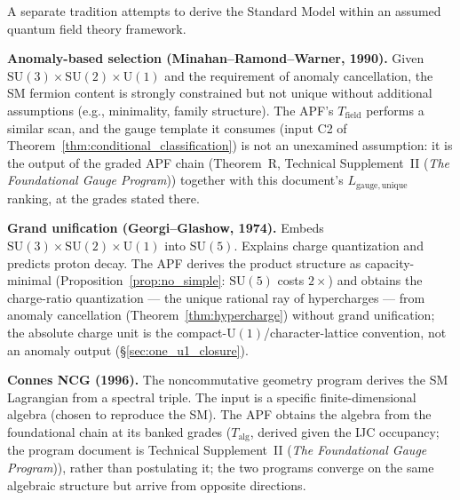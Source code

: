 \documentclass[11pt]{article}
\theoremstyle{definition}
\newcommand{\SU}{\mathrm{SU}}
\newcommand{\U}{\mathrm{U}}
\newcommand{\TSII}{Technical Supplement~II (\emph{The Foundational Gauge Program})}
\begin{document}
A separate tradition attempts to derive the Standard Model within an
assumed quantum field theory framework.

\smallskip\noindent\textbf{Anomaly-based selection
(Minahan--Ramond--Warner, 1990).}\quad
Given $\SU(3) \times \SU(2) \times \U(1)$ and the requirement of
anomaly cancellation, the SM fermion content is strongly constrained
but not unique without additional assumptions (e.g., minimality,
family structure).  The APF's $T_{\mathrm{field}}$ performs a similar
scan, and the gauge template it consumes (input C2 of
Theorem~\ref{thm:conditional_classification}) is not an unexamined
assumption: it is the output of the graded APF chain (Theorem~R,
\TSII{}) together with this document's $L_{\mathrm{gauge,unique}}$
ranking, at the grades stated there.

\smallskip\noindent\textbf{Grand unification (Georgi--Glashow, 1974).}\quad
Embeds $\SU(3) \times \SU(2) \times \U(1)$ into $\SU(5)$.  Explains
charge quantization and predicts proton decay.  The APF derives the
product structure as capacity-minimal
(Proposition~\ref{prop:no_simple}: $\SU(5)$ costs $2\times$) and
obtains the charge-ratio quantization --- the unique rational ray of
hypercharges --- from anomaly cancellation
(Theorem~\ref{thm:hypercharge}) without grand unification; the
absolute charge unit is the compact-$\U(1)$/character-lattice
convention, not an anomaly output (\S\ref{sec:one_u1_closure}).

\smallskip\noindent\textbf{Connes NCG (1996).}\quad
The noncommutative geometry program derives the SM Lagrangian from a
spectral triple.  The input is a specific finite-dimensional algebra
(chosen to reproduce the SM).  The APF obtains the algebra from the foundational chain at its banked
grades ($T_{\mathrm{alg}}$, derived given the IJC occupancy; the
program document is \TSII{}), rather than postulating it; the two
programs converge on the same algebraic structure but arrive from
opposite directions.
\end{document}
